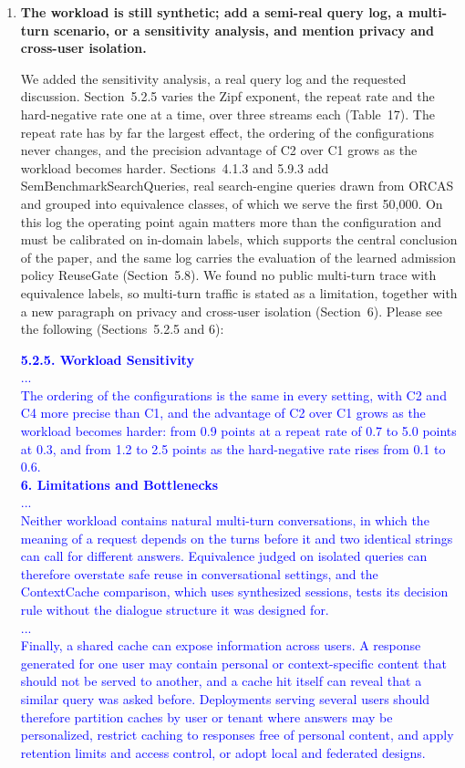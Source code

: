 \documentclass[11pt]{article}
\begin{document}
\begin{enumerate}[leftmargin=*, itemsep=1.2em]
\item \textbf{The workload is still synthetic; add a semi-real query log, a multi-turn scenario, or a sensitivity analysis, and mention privacy and cross-user isolation.}

We added the sensitivity analysis, a real query log and the requested discussion. Section~5.2.5 varies the Zipf exponent, the repeat rate and the hard-negative rate one at a time, over three streams each (Table~17). The repeat rate has by far the largest effect, the ordering of the configurations never changes, and the precision advantage of C2 over C1 grows as the workload becomes harder. Sections~4.1.3 and 5.9.3 add SemBenchmarkSearchQueries, real search-engine queries drawn from ORCAS and grouped into equivalence classes, of which we serve the first 50,000. On this log the operating point again matters more than the configuration and must be calibrated on in-domain labels, which supports the central conclusion of the paper, and the same log carries the evaluation of the learned admission policy ReuseGate (Section~5.8). We found no public multi-turn trace with equivalence labels, so multi-turn traffic is stated as a limitation, together with a new paragraph on privacy and cross-user isolation (Section~6). Please see the following (Sections~5.2.5 and 6):

\textcolor{blue}{\textbf{5.2.5. Workload Sensitivity}\\
...\\
The ordering of the configurations is the same in every setting, with C2 and C4 more precise than C1, and the advantage of C2 over C1 grows as the workload becomes harder: from 0.9 points at a repeat rate of 0.7 to 5.0 points at 0.3, and from 1.2 to 2.5 points as the hard-negative rate rises from 0.1 to 0.6.\\
\textbf{6. Limitations and Bottlenecks}\\
...\\
Neither workload contains natural multi-turn conversations, in which the meaning of a request depends on the turns before it and two identical strings can call for different answers. Equivalence judged on isolated queries can therefore overstate safe reuse in conversational settings, and the ContextCache comparison, which uses synthesized sessions, tests its decision rule without the dialogue structure it was designed for.\\
...\\
Finally, a shared cache can expose information across users. A response generated for one user may contain personal or context-specific content that should not be served to another, and a cache hit itself can reveal that a similar query was asked before. Deployments serving several users should therefore partition caches by user or tenant where answers may be personalized, restrict caching to responses free of personal content, and apply retention limits and access control, or adopt local and federated designs.}

\end{enumerate}
\end{document}
